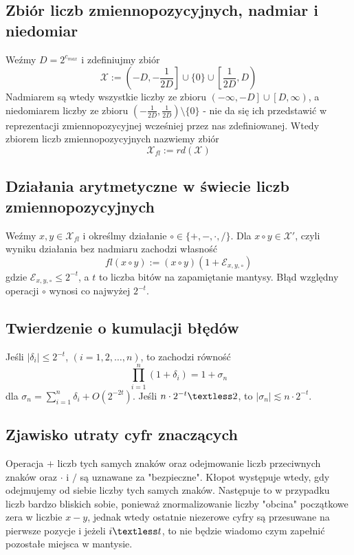 \documentclass[a4paper,11pt]{article}
\begin{document}
\subsection{Zbiór liczb zmiennopozycyjnych, nadmiar i niedomiar}
Weźmy $D=2^{c_{max}}$  i zdefiniujmy zbiór 
$$\mathcal{X} := \left(-D, -\frac{1}{2D}\right] \cup \{0\} \cup \left[\frac{1}{2D}, D\right)$$
Nadmiarem są wtedy wszystkie liczby ze zbioru $\left(-\infty, -D\right] \cup \left[D, \infty\right)$, a niedomiarem liczby ze zbioru $\left(-\frac{1}{2D}, \frac{1}{2D}\right) \setminus \{0\}$ - nie da się ich przedstawić w reprezentacji zmiennopozycyjnej wcześniej przez nas zdefiniowanej. Wtedy zbiorem liczb zmiennopozycyjnych nazwiemy zbiór 
$$ \mathcal{X}_{fl} := rd\left(\mathcal{X}\right)$$

\subsection{Działania arytmetyczne w świecie liczb zmiennopozycyjnych}
Weźmy $x, y \in \mathcal{X}_{fl}$ i określmy działanie $\circ \in \{+,-,\cdot, /\}$. Dla $x \circ y \in \mathcal{X}'$, czyli wyniku działania bez nadmiaru zachodzi własność
$$ fl\left(x \circ y \right) := \left( x \circ y \right)\left( 1 + \mathcal{E}_{x, y, \circ}\right) $$
gdzie $\mathcal{E}_{x, y, \circ} \leq 2^{-t}$, a $t$ to liczba bitów na zapamiętanie mantysy.
\newline Błąd względny operacji $\circ$ wynosi co najwyżej $2^{-t}$.

\subsection{Twierdzenie o kumulacji błędów}
Jeśli $\left| \delta_{i} \right| \leq 2^{-t}$, $\left( i = 1,2,\ldots, n\right)$, to zachodzi równość
$$ \prod\limits_{i=1}^{n} \left( 1 + \delta_{i} \right) = 1 + \sigma_{n} $$
dla $\sigma_{n} = \sum\limits_{i=1}^{n} \delta_{i} + O(2^{-2t})$. Jeśli $n\cdot 2^{-t} \textless 2$, to $\left| \sigma_{n} \right| \lesssim n\cdot 2^{-t}$.

\subsection{Zjawisko utraty cyfr znaczących}
Operacja $+$ liczb tych samych znaków oraz odejmowanie liczb przeciwnych znaków oraz $\cdot$ i $/$ są uznawane za "bezpieczne". Kłopot występuje wtedy, gdy odejmujemy od siebie liczby tych samych znaków. Następuje to w przypadku liczb bardzo bliskich sobie, ponieważ znormalizowanie liczby "obcina" początkowe zera w liczbie $x-y$, jednak wtedy ostatnie niezerowe cyfry są przesuwane na pierwsze pozycje i jeżeli $i\textless t$, to nie będzie wiadomo czym zapełnić pozostałe miejsca w mantysie.
\end{document}
